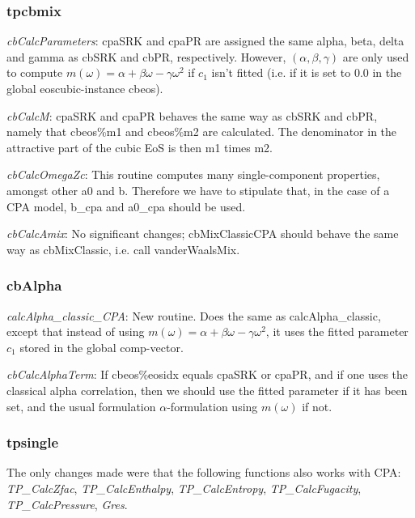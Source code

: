 \documentclass[english]{../thermomemo/thermomemo}
\begin{document}
\subsubsection*{tpcbmix}
\textit{cbCalcParameters}: cpaSRK and cpaPR are assigned the same alpha, beta, delta and gamma as cbSRK and cbPR, respectively. However, $(\alpha,\beta,\gamma)$ are only used to compute $m(\omega)=\alpha + \beta \omega - \gamma \omega^2$ if $c_1$ isn't fitted (i.e. if it is set to $0.0$ in the global eoscubic-instance cbeos).

\textit{cbCalcM}: cpaSRK and cpaPR behaves the same way as cbSRK and cbPR, namely that cbeos\%m1 and cbeos\%m2 are calculated. The denominator in the attractive part of the cubic EoS is then m1 times m2.

\textit{cbCalcOmegaZc}: This routine computes many single-component properties, amongst other a0 and b. Therefore we have to stipulate that, in the case of a CPA model, b\_cpa and a0\_cpa should be used.

\textit{cbCalcAmix}: No significant changes; cbMixClassicCPA should behave the same way as cbMixClassic, i.e. call vanderWaalsMix.

\subsubsection*{cbAlpha}

\textit{calcAlpha\_classic\_CPA}: New routine. Does the same as calcAlpha\_classic, except that instead of using $m(\omega)=\alpha + \beta \omega - \gamma \omega^2$, it uses the fitted parameter $c_1$ stored in the global comp-vector.

\textit{cbCalcAlphaTerm}: If cbeos\%eosidx equals cpaSRK or cpaPR, and if one uses the classical alpha correlation, then we should use the fitted parameter if it has been set, and the usual formulation $\alpha$-formulation using $m(\omega)$ if not.

\subsubsection*{tpsingle}
The only changes made were that the following functions also works with CPA: \textit{TP\_CalcZfac}, \textit{TP\_CalcEnthalpy}, \textit{TP\_CalcEntropy}, \textit{TP\_CalcFugacity}, \textit{TP\_CalcPressure}, \textit{Gres}.
\end{document}
